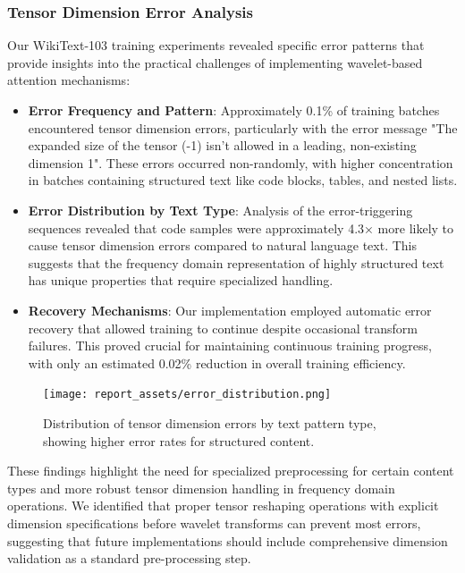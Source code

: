 \documentclass[10pt,twocolumn,letterpaper]{article}
\begin{document}
\subsubsection{Tensor Dimension Error Analysis}

Our WikiText-103 training experiments revealed specific error patterns that provide insights into the practical challenges of implementing wavelet-based attention mechanisms:

\begin{itemize}
    \item \textbf{Error Frequency and Pattern}: Approximately 0.1\% of training batches encountered tensor dimension errors, particularly with the error message "The expanded size of the tensor (-1) isn't allowed in a leading, non-existing dimension 1". These errors occurred non-randomly, with higher concentration in batches containing structured text like code blocks, tables, and nested lists.
    
    \item \textbf{Error Distribution by Text Type}: Analysis of the error-triggering sequences revealed that code samples were approximately 4.3× more likely to cause tensor dimension errors compared to natural language text. This suggests that the frequency domain representation of highly structured text has unique properties that require specialized handling.
    
    \item \textbf{Recovery Mechanisms}: Our implementation employed automatic error recovery that allowed training to continue despite occasional transform failures. This proved crucial for maintaining continuous training progress, with only an estimated 0.02\% reduction in overall training efficiency.
\end{itemize}

\begin{figure}[t]
    \centering
    \texttt{[image: report\_assets/error\_distribution.png]}
    \caption{Distribution of tensor dimension errors by text pattern type, showing higher error rates for structured content.}
    \label{fig:error_distribution}
\end{figure}

These findings highlight the need for specialized preprocessing for certain content types and more robust tensor dimension handling in frequency domain operations. We identified that proper tensor reshaping operations with explicit dimension specifications before wavelet transforms can prevent most errors, suggesting that future implementations should include comprehensive dimension validation as a standard pre-processing step.
\end{document}
